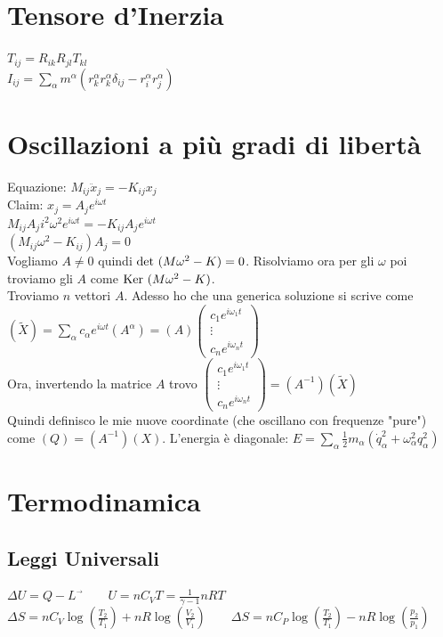 \documentclass[a4paper,NoNotes,GeneralMath,12pt]{stdmdoc}
\begin{document}
	\section*{Tensore d'Inerzia}
	$T_{ij} = R_{ik} R_{jl} T_{kl}$ \\ $I_{ij} = \sum_\alpha m^{\alpha} \left( r_k^\alpha r_k^\alpha \delta_{ij} - r_i^\alpha r_j^\alpha \right)$

	\section*{Oscillazioni a più gradi di libertà}
	Equazione: $M_{ij} \ddot{x}_j = -K_{ij} x_j$ \\
	Claim: $x_j = A_j e^{i\omega t}$ \\
	$M_{ij} A_j i^2 \omega^2 e^{i\omega t} = - K_{ij} A_{j} e^{i\omega t}$ \\
	$\left(M_{ij} \omega^2 - K_{ij} \right) A_j = 0$ \\
	Vogliamo $A \neq 0$ quindi $\mbox{det } (M\omega^2 - K) = 0$. Risolviamo ora per gli $\omega$ poi troviamo gli $A$ come $\mbox{Ker } (M\omega^2 - K )$. \\
	Troviamo $n$ vettori $A$. Adesso ho che una generica soluzione si scrive come $\left(\tilde{X}\right) = \sum_\alpha c_\alpha e^{i\omega t} \left( A^\alpha \right) = \left( A \right) \left( \begin{array}{c} c_1 e^{i\omega_1 t} \\ \vdots \\ c_n e^{i\omega_n t} \end{array} \right)$ \\
	Ora, invertendo la matrice $A$ trovo $\left( \begin{array}{c} c_1 e^{i\omega_1 t} \\ \vdots \\ c_n e^{i\omega_n t} \end{array} \right) = \left( A^{-1} \right) \left( \tilde{X} \right)$ \\
	Quindi definisco le mie nuove coordinate (che oscillano con frequenze "pure") come $\left( Q \right) = \left( A^{-1} \right) \left( X \right)$. L'energia è diagonale: $E = \sum_\alpha \frac{1}{2} m_\alpha ({\dot{q}_\alpha^2} + \omega_\alpha^2 q_\alpha^2 )$

	\section*{Termodinamica}
	\subsection*{Leggi Universali}
	$\Delta U = Q - L^{\vec{}} \qquad U = n C_V T = \frac{1}{\gamma -1} nRT$ \\
	$\Delta S = nC_V \log \left( \frac{T_2}{T_1} \right) + n R \log \left( \frac{V_2}{V_1} \right) \qquad \Delta S = n C_P \log \left( \frac{T_2}{T_1} \right) - n R \log \left( \frac{p_2}{p_1} \right)$
\end{document}
